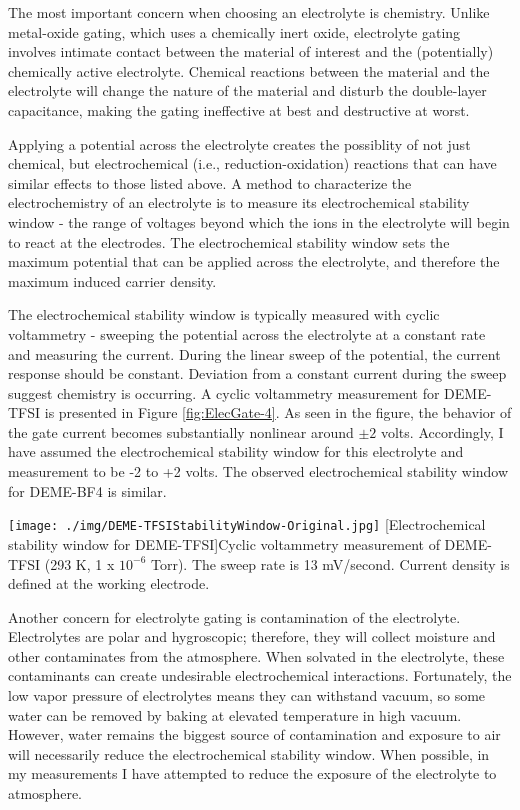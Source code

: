 The most important concern when choosing an electrolyte is chemistry. Unlike metal-oxide gating, which uses a chemically inert oxide, electrolyte gating involves intimate contact between the material of interest and the (potentially) chemically active electrolyte. Chemical reactions between the material and the electrolyte will change the nature of the material and disturb the double-layer capacitance, making the gating ineffective at best and destructive at worst. 

Applying a potential across the electrolyte creates the possiblity of not just chemical, but electrochemical (i.e., reduction-oxidation) reactions that can have similar effects to those listed above. A method to characterize the electrochemistry of an electrolyte is to measure its electrochemical stability window - the range of voltages beyond which the ions in the electrolyte will begin to react at the electrodes. The electrochemical stability window sets the maximum potential that can be applied across the electrolyte, and therefore the maximum induced carrier density.

The electrochemical stability window is typically measured with cyclic voltammetry - sweeping the potential across the electrolyte at a constant rate and measuring the current. During the linear sweep of the potential, the current response should be constant. Deviation from a constant current during the sweep suggest chemistry is occurring. A cyclic voltammetry measurement for DEME-TFSI is presented in Figure \ref{fig:ElecGate-4}. As seen in the figure, the behavior of the gate current becomes substantially nonlinear around $\pm 2$ volts. Accordingly, I have assumed the electrochemical stability window for this electrolyte and  measurement to be -2 to +2 volts. The observed electrochemical stability window for DEME-BF4 is similar.

\begin{centering}
\texttt{[image: ./img/DEME-TFSIStabilityWindow-Original.jpg]}
  \captionsetup{width=0.75\textwidth}
  [Electrochemical stability window for DEME-TFSI]{Cyclic voltammetry measurement of DEME-TFSI (293 K, 1 x $10^{-6}$ Torr). The sweep rate is 13 mV/second. Current density is defined at the working electrode.} 
  \label{fig:ElecGate-4}
\end{centering}

Another concern for electrolyte gating is contamination of the electrolyte. Electrolytes are polar and hygroscopic; therefore, they will collect moisture and other contaminates from the atmosphere. When solvated in the electrolyte, these contaminants can create undesirable electrochemical interactions. Fortunately, the low vapor pressure of electrolytes means they can withstand vacuum, so some water can be removed by baking at elevated temperature in high vacuum. However, water remains the biggest source of contamination and exposure to air will necessarily reduce the electrochemical stability window. When possible, in my measurements I have attempted to reduce the exposure of the electrolyte to atmosphere.

